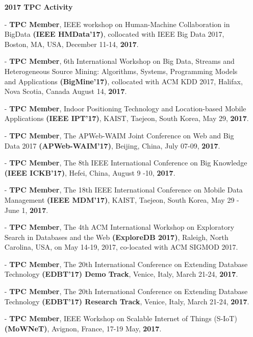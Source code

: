 \documentclass[10pt]{article}
\begin{document}
\begin{itemize}
\begin{itemize}
\vspace{0.1in}
\item[]{\bf 2017 TPC Activity\hrulefill }
%

\item[-] {\bf TPC Member}, IEEE workshop on Human-Machine Collaboration in BigData {\bf (IEEE HMData'17)}, collocated with IEEE Big Data 2017, Boston, MA, USA, December 11-14, {\bf 2017}.
\item[-] {\bf TPC Member}, 6th International Workshop on Big Data, Streams and Heterogeneous Source Mining: Algorithms, Systems, Programming Models and Applications {\bf (BigMine'17)}, collocated with ACM KDD 2017, Halifax, Nova Scotia, Canada August 14, {\bf 2017}.
\item[-] {\bf TPC Member}, Indoor Positioning Technology and Location-based Mobile Applications {\bf (IEEE IPT'17)}, KAIST, Taejeon, South Korea, May 29, {\bf 2017}.
\item[-] {\bf TPC Member}, The APWeb-WAIM Joint Conference on Web and Big Data 2017 {\bf (APWeb-WAIM'17)}, Beijing, China, July 07-09, {\bf 2017}.
\item[-] {\bf TPC Member}, The 8th IEEE International Conference on Big Knowledge {\bf (IEEE ICKB'17)}, Hefei, China, August 9 -10, {\bf 2017}.
\item[-] {\bf TPC Member}, The 18th IEEE International Conference on Mobile Data Management {\bf (IEEE MDM'17)}, KAIST, Taejeon, South Korea, May 29 - June 1, {\bf 2017}.
\item[-] {\bf TPC Member}, The 4th ACM International Workshop on Exploratory Search in Databases and the Web {\bf (ExploreDB 2017)}, Raleigh, North Carolina, USA, on May 14-19, 2017, co-located with ACM SIGMOD 2017.
\item[-] {\bf TPC Member}, The 20th International Conference on Extending Database Technology {\bf (EDBT'17) Demo Track}, Venice, Italy, March 21-24, {\bf 2017}.
\item[-] {\bf TPC Member}, The 20th International Conference on Extending Database Technology {\bf (EDBT'17) Research Track},  Venice, Italy, March 21-24, {\bf 2017}.
\item[-] {\bf TPC Member}, IEEE Workshop on Scalable Internet of Things (S-IoT) {\bf (MoWNeT)}, Avignon, France, 17-19 May, {\bf 2017}.


\end{itemize}
\end{itemize}
\end{document}
